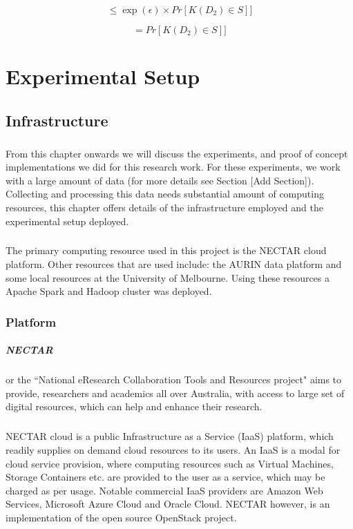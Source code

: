 \documentclass[12pt]{report}
\begin{document}
\begin{equation}
[Pr[\mathit{K}(D_{1})\in S] \leq \exp (\epsilon ) \times Pr[\mathit{K}(D_{2})\in S]] \end{equation}

\begin{equation}
[Pr[\mathit{K}(D_{1})\in S]  = Pr[\mathit{K}(D_{2})\in S]]
\end{equation}


\chapter{Experimental Setup}
\section{Infrastructure}
\paragraph{}
From this chapter onwards we will discuss the experiments, and proof of concept implementations we did for this research work. For these experiments, we work with a large amount of data (for more details see Section [Add Section]). Collecting and processing this data needs substantial amount of computing resources, this chapter offers details of the infrastructure employed and the experimental setup deployed.
\paragraph{}
The primary computing resource used in this project is the NECTAR\cite{NECTAR} cloud platform. Other resources that are used include: the AURIN\cite{AURIN} data platform and some local resources at the University of Melbourne. Using these resources a Apache Spark and Hadoop cluster was deployed.

\subsection{Platform}
\paragraph{NECTAR} or the ``National eResearch Collaboration Tools and Resources project" aims to provide, researchers and academics all over Australia, with access to large set of digital resources, which can help and enhance their research. 
\paragraph{}
NECTAR cloud is a public Infrastructure as a Service (IaaS) platform, which readily supplies on demand cloud resources to its users. An IaaS is a modal for cloud service provision, where computing resources such as Virtual Machines, Storage Containers etc. are provided to the user as a service, which may be charged as per usage. Notable commercial IaaS providers are Amazon Web Services\cite{AWS}, Microsoft Azure Cloud\cite{Azure} and Oracle Cloud\cite{OracleCloud}. NECTAR however, is an implementation of the open source OpenStack\cite{OpenStack} project.
\end{document}
